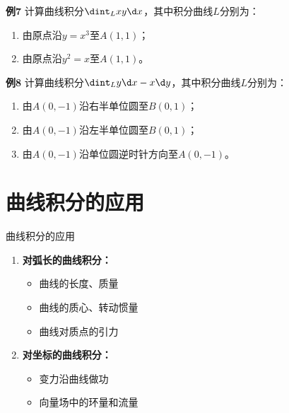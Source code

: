 \begin{frame}
	\linespread{1.2}
	\begin{exampleblock}{{\bf 例7}\hfill}
		计算曲线积分$\dint_Lxy\d x$，其中积分曲线$L$分别为：
		\begin{enumerate}
		  \item 由原点沿$y=x^3$至$A(1,1)$；
		  \item 由原点沿$y^2=x$至$A(1,1)$。
		\end{enumerate}
	\end{exampleblock}
\end{frame}

\begin{frame}
	\linespread{1.2}
	\begin{exampleblock}{{\bf 例8}\hfill}
		计算曲线积分$\dint_Ly\d x-x\d y$，其中积分曲线$L$分别为：
		\begin{enumerate}
		  \item 由$A(0,-1)$沿右半单位圆至$B(0,1)$；
		  \item 由$A(0,-1)$沿左半单位圆至$B(0,1)$；
		  \item 由$A(0,-1)$沿单位圆逆时针方向至$A(0,-1)$。
		\end{enumerate}
	\end{exampleblock}
\end{frame}

\section{曲线积分的应用}

\begin{frame}[<+->]{曲线积分的应用}
	\linespread{1.5}
	\begin{enumerate}
	  \item {\bf 对弧长的曲线积分：}
	  \begin{itemize}
	    \item 曲线的长度、质量
	    \item 曲线的质心、转动惯量
	    \item 曲线对质点的引力
	  \end{itemize}
	  \item {\bf 对坐标的曲线积分：}
	  \begin{itemize}
	    \item 变力沿曲线做功
	    \item \alert{向量场中的环量和流量}
	  \end{itemize}
	\end{enumerate}
\end{frame}

